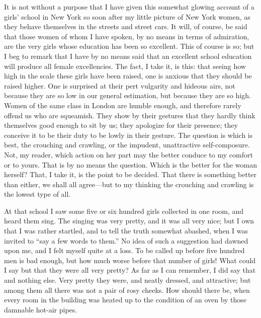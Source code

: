 It is not without a purpose that I have given this somewhat glowing
account of a girls' school in New York so soon after my little
picture of New York women, as they behave themselves in the streets
and street cars.  It will, of course, be said that those women of
whom I have spoken, by no means in terms of admiration, are the
very girls whose education has been so excellent.  This of course
is so; but I beg to remark that I have by no means said that an
excellent school education will produce all female excellencies.
The fact, I take it, is this: that seeing how high in the scale
these girls have been raised, one is anxious that they should be
raised higher.  One is surprised at their pert vulgarity and
hideous airs, not because they are so low in our general
estimation, but because they are so high.  Women of the same class
in London are humble enough, and therefore rarely offend us who are
squeamish.  They show by their gestures that they hardly think
themselves good enough to sit by us; they apologize for their
presence; they conceive it to be their duty to be lowly in their
gesture.  The question is which is best, the crouching and
crawling, or the impudent, unattractive self-composure.  Not, my
reader, which action on her part may the better conduce to my
comfort or to yours.  That is by no means the question.  Which is
the better for the woman herself?  That, I take it, is the point to
be decided.  That there is something better than either, we shall
all agree---but to my thinking the crouching and crawling is the
lowest type of all.

At that school I saw some five or six hundred girls collected in
one room, and heard them sing.  The singing was very pretty, and it
was all very nice; but I own that I was rather startled, and to
tell the truth somewhat abashed, when I was invited to ``say a few
words to them.''  No idea of such a suggestion had dawned upon me,
and I felt myself quite at a loss.  To be called up before five
hundred men is bad enough, but how much worse before that number of
girls!  What could I say but that they were all very pretty?  As
far as I can remember, I did say that and nothing else.  Very
pretty they were, and neatly dressed, and attractive; but among
them all there was not a pair of rosy cheeks.  How should there be,
when every room in the building was heated up to the condition of
an oven by those damnable hot-air pipes.

